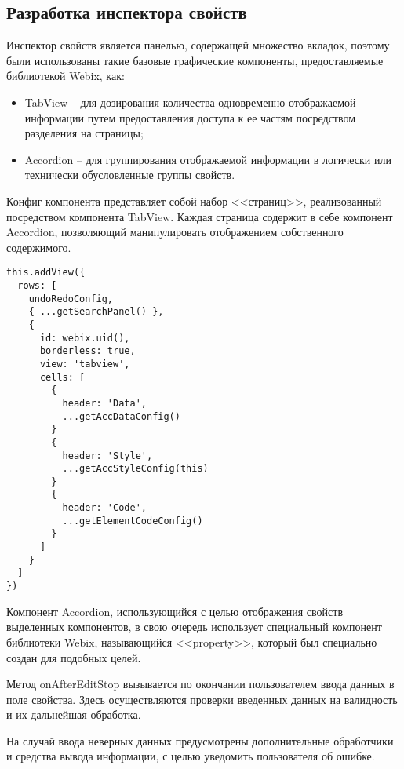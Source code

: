 \subsection{Разработка инспектора свойств}
\label{sec:development:property_inspector}

Инспектор свойств является панелью, содержащей множество вкладок, поэтому были использованы такие базовые графические компоненты, предоставляемые библиотекой Webix, как:

\begin{itemize}
    \item TabView -- для дозирования количества одновременно отображаемой информации путем предоставления доступа к ее частям посредством разделения на страницы;
    \item Accordion -- для группирования отображаемой информации в логически или технически обусловленные группы свойств.
\end{itemize}

Конфиг компонента представляет собой набор <<страниц>>, реализованный посредством компонента TabView. Каждая страница содержит в себе компонент Accordion, позволяющий манипулировать отображением собственного содержимого.

\begin{lstlisting}
this.addView({
  rows: [
    undoRedoConfig,
    { ...getSearchPanel() },
    {
      id: webix.uid(),
      borderless: true,
      view: 'tabview',
      cells: [
        {
          header: 'Data',
          ...getAccDataConfig()
        }
        {
          header: 'Style',
          ...getAccStyleConfig(this)
        }
        {
          header: 'Code',
          ...getElementCodeConfig()
        }
      ]
    }
  ]
})
\end{lstlisting}

Компонент Accordion, использующийся с целью отображения свойств выделенных компонентов, в свою очередь использует специальный компонент библиотеки Webix, называющийся <<property>>, который был специально создан для подобных целей.

Метод onAfterEditStop вызывается по окончании пользователем ввода данных в поле свойства. Здесь осуществляются проверки введенных данных на валидность и их дальнейшая обработка.

На случай ввода неверных данных предусмотрены дополнительные обработчики и средства вывода информации, с целью уведомить пользователя об ошибке.


